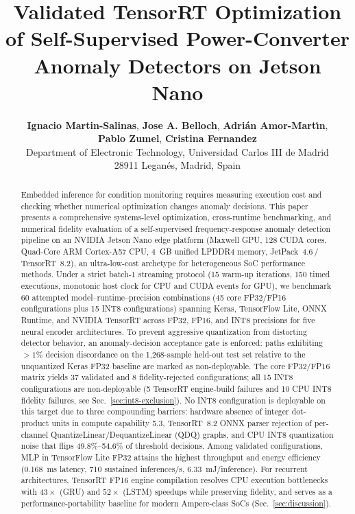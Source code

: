 \documentclass[11pt,a4paper]{article}
\title{\textbf{Validated TensorRT Optimization of Self-Supervised Power-Converter Anomaly Detectors on Jetson Nano}}
\author{
    \textbf{Ignacio Martin-Salinas}, \textbf{Jose A. Belloch}, \textbf{Adri{\'a}n Amor-Mart{\'\i}n}, \\
    \textbf{Pablo Zumel}, \textbf{Cristina Fernandez} \\
    \small Department of Electronic Technology, Universidad Carlos III de Madrid \\
    \small 28911 Legan{\'e}s, Madrid, Spain
}
\date{}
\begin{document}
\maketitle

\begin{abstract}
Embedded inference for condition monitoring requires measuring execution cost and checking whether numerical optimization changes anomaly decisions. This paper presents a comprehensive systems-level optimization, cross-runtime benchmarking, and numerical fidelity evaluation of a self-supervised frequency-response anomaly detection pipeline on an NVIDIA Jetson Nano edge platform (Maxwell GPU, 128 CUDA cores, Quad-Core ARM Cortex-A57 CPU, 4~GB unified LPDDR4 memory, JetPack~4.6\,/\,TensorRT~8.2), an ultra-low-cost archetype for heterogeneous SoC performance methods. Under a strict batch-1 streaming protocol (15 warm-up iterations, 150 timed executions, monotonic host clock for CPU and CUDA events for GPU), we benchmark 60 attempted model--runtime--precision combinations (45 core FP32/FP16 configurations plus 15 INT8 configurations) spanning Keras, TensorFlow Lite, ONNX Runtime, and NVIDIA TensorRT across FP32, FP16, and INT8 precisions for five neural encoder architectures. To prevent aggressive quantization from distorting detector behavior, an anomaly-decision acceptance gate is enforced: paths exhibiting $>1\%$ decision discordance on the 1{,}268-sample held-out test set relative to the unquantized Keras FP32 baseline are marked as non-deployable. The core FP32/FP16 matrix yields 37 validated and 8 fidelity-rejected configurations; all 15 INT8 configurations are non-deployable (5 TensorRT engine-build failures and 10 CPU INT8 fidelity failures, see Sec.~\ref{sec:int8-exclusion}). No INT8 configuration is deployable on this target due to three compounding barriers: hardware absence of integer dot-product units in compute capability 5.3, TensorRT~8.2 ONNX parser rejection of per-channel QuantizeLinear/DequantizeLinear (QDQ) graphs, and CPU INT8 quantization noise that flips 49.8\%--54.6\% of threshold decisions. Among validated configurations, MLP in TensorFlow Lite FP32 attains the highest throughput and energy efficiency (0.168~ms latency, 710 sustained inferences/s, 6.33~mJ/inference). For recurrent architectures, TensorRT FP16 engine compilation resolves CPU execution bottlenecks with $43\times$ (GRU) and $52\times$ (LSTM) speedups while preserving fidelity, and serves as a performance-portability baseline for modern Ampere-class SoCs (Sec.~\ref{sec:discussion}).
\end{abstract}
\end{document}
